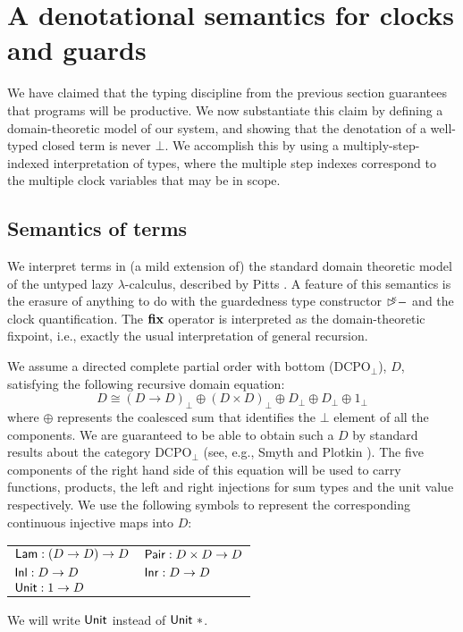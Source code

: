 \section{A denotational semantics for clocks and guards}
\label{sec:semantics}

We have claimed that the typing discipline from the previous section
guarantees that programs will be productive. We now substantiate this
claim by defining a domain-theoretic model of our system, and showing
that the denotation of a well-typed closed term is never $\bot$. We
accomplish this by using a multiply-step-indexed interpretation of
types, where the multiple step indexes correspond to the multiple
clock variables that may be in scope.

\subsection{Semantics of terms}
\label{sec:semantics-of-programs}

We interpret terms in (a mild extension of) the standard domain
theoretic model of the untyped lazy $\lambda$-calculus, described by
Pitts \cite{PittsAM:compavm}. A feature of this semantics is the
erasure of anything to do with the guardedness type constructor
$\mathord{\rhd\kern-0.4em^{\kappa}}-$ and the clock quantification. The $\textbf{fix}$ operator
is interpreted as the domain-theoretic fixpoint, i.e., exactly the
usual interpretation of general recursion.

We assume a directed complete partial order with bottom
($\mathrm{DCPO}_\bot$), $D$, satisfying the following recursive domain
equation:
\begin{displaymath}
  D \cong (D \to D)_\bot \oplus (D \times D)_\bot \oplus D_\bot \oplus D_\bot \oplus 1_\bot
\end{displaymath}
where $\oplus$ represents the coalesced sum that identifies the $\bot$
element of all the components. We are guaranteed to be able to obtain
such a $D$ by standard results about the category $\mathrm{DCPO}_\bot$
(see, e.g., Smyth and Plotkin \cite{smyth82category}). The five
components of the right hand side of this equation will be used to
carry functions, products, the left and right injections for sum types
and the unit value respectively. We use the following symbols to
represent the corresponding continuous injective maps into $D$:
\begin{center}
  \begin{tabular}{ll}
    $\mathsf{Lam} : (D \to D) \to D$ & $\mathsf{Pair} : D \times D \to D$ \\
    $\mathsf{Inl} : D \to D$ & $\mathsf{Inr} : D \to D$ \\
    $\mathsf{Unit} : 1 \to D$
  \end{tabular}  
\end{center}
We will write $\mathsf{Unit}$ instead of $\mathsf{Unit}\ *$.

